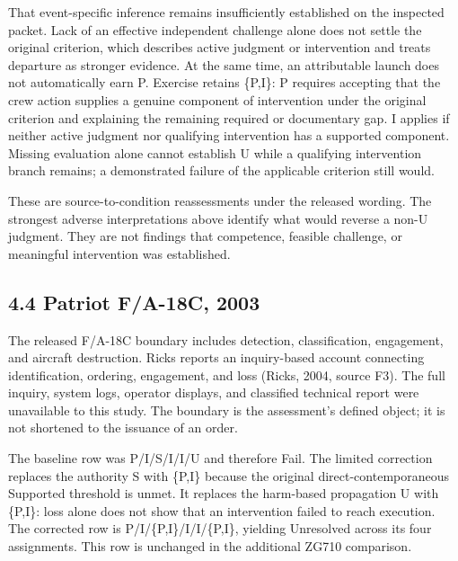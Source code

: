 \documentclass[11pt]{article}
\begin{document}
That event-specific inference remains insufficiently established on the inspected packet. Lack of an effective independent challenge alone does not settle the original criterion, which describes active judgment or intervention and treats departure as stronger evidence. At the same time, an attributable launch does not automatically earn P. Exercise retains \{P,I\}: P requires accepting that the crew action supplies a genuine component of intervention under the original criterion and explaining the remaining required or documentary gap. I applies if neither active judgment nor qualifying intervention has a supported component. Missing evaluation alone cannot establish U while a qualifying intervention branch remains; a demonstrated failure of the applicable criterion still would.

These are source-to-condition reassessments under the released wording. The strongest adverse interpretations above identify what would reverse a non-U judgment. They are not findings that competence, feasible challenge, or meaningful intervention was established.

\subsection*{4.4 Patriot F/A-18C, 2003}

The released F/A-18C boundary includes detection, classification, engagement, and aircraft destruction. Ricks reports an inquiry-based account connecting identification, ordering, engagement, and loss (Ricks, 2004, source F3). The full inquiry, system logs, operator displays, and classified technical report were unavailable to this study. The boundary is the assessment’s defined object; it is not shortened to the issuance of an order.

The baseline row was P/I/S/I/I/U and therefore Fail. The limited correction replaces the authority S with \{P,I\} because the original direct-contemporaneous Supported threshold is unmet. It replaces the harm-based propagation U with \{P,I\}: loss alone does not show that an intervention failed to reach execution. The corrected row is P/I/\{P,I\}/I/I/\{P,I\}, yielding Unresolved across its four assignments. This row is unchanged in the additional ZG710 comparison.
\end{document}
